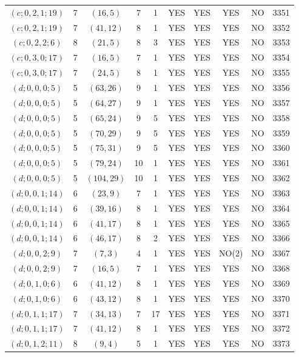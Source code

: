 \begin{longtable}{|c|c|c|c|c|c|c|c|c|c|}
$(c; 0, 2, 1; 19)$ & 7 & $(16, 5)$ & 7 & 1 & YES & YES & YES & NO & 3351\\
$(c; 0, 2, 1; 19)$ & 7 & $(41, 12)$ & 8 & 1 & YES & YES & YES & NO & 3352\\
$(c; 0, 2, 2; 6)$ & 8 & $(21, 5)$ & 8 & 3 & YES & YES & YES & NO & 3353\\
$(c; 0, 3, 0; 17)$ & 7 & $(16, 5)$ & 7 & 1 & YES & YES & YES & NO & 3354\\
$(c; 0, 3, 0; 17)$ & 7 & $(24, 5)$ & 8 & 1 & YES & YES & YES & NO & 3355\\
$(d; 0, 0, 0; 5)$ & 5 & $(63, 26)$ & 9 & 1 & YES & YES & YES & NO & 3356\\
$(d; 0, 0, 0; 5)$ & 5 & $(64, 27)$ & 9 & 1 & YES & YES & YES & NO & 3357\\
$(d; 0, 0, 0; 5)$ & 5 & $(65, 24)$ & 9 & 5 & YES & YES & YES & NO & 3358\\
$(d; 0, 0, 0; 5)$ & 5 & $(70, 29)$ & 9 & 5 & YES & YES & YES & NO & 3359\\
$(d; 0, 0, 0; 5)$ & 5 & $(75, 31)$ & 9 & 5 & YES & YES & YES & NO & 3360\\
$(d; 0, 0, 0; 5)$ & 5 & $(79, 24)$ & 10 & 1 & YES & YES & YES & NO & 3361\\
$(d; 0, 0, 0; 5)$ & 5 & $(104, 29)$ & 10 & 1 & YES & YES & YES & NO & 3362\\
$(d; 0, 0, 1; 14)$ & 6 & $(23, 9)$ & 7 & 1 & YES & YES & YES & NO & 3363\\
$(d; 0, 0, 1; 14)$ & 6 & $(39, 16)$ & 8 & 1 & YES & YES & YES & NO & 3364\\
$(d; 0, 0, 1; 14)$ & 6 & $(41, 17)$ & 8 & 1 & YES & YES & YES & NO & 3365\\
$(d; 0, 0, 1; 14)$ & 6 & $(46, 17)$ & 8 & 2 & YES & YES & YES & NO & 3366\\
$(d; 0, 0, 2; 9)$ & 7 & $(7, 3)$ & 4 & 1 & YES & YES & NO(2) & NO & 3367\\
$(d; 0, 0, 2; 9)$ & 7 & $(16, 5)$ & 7 & 1 & YES & YES & YES & NO & 3368\\
$(d; 0, 1, 0; 6)$ & 6 & $(41, 12)$ & 8 & 1 & YES & YES & YES & NO & 3369\\
$(d; 0, 1, 0; 6)$ & 6 & $(43, 12)$ & 8 & 1 & YES & YES & YES & NO & 3370\\
$(d; 0, 1, 1; 17)$ & 7 & $(34, 13)$ & 7 & 17 & YES & YES & YES & NO & 3371\\
$(d; 0, 1, 1; 17)$ & 7 & $(41, 12)$ & 8 & 1 & YES & YES & YES & NO & 3372\\
$(d; 0, 1, 2; 11)$ & 8 & $(9, 4)$ & 5 & 1 & YES & YES & YES & NO & 3373\\

\end{longtable}
